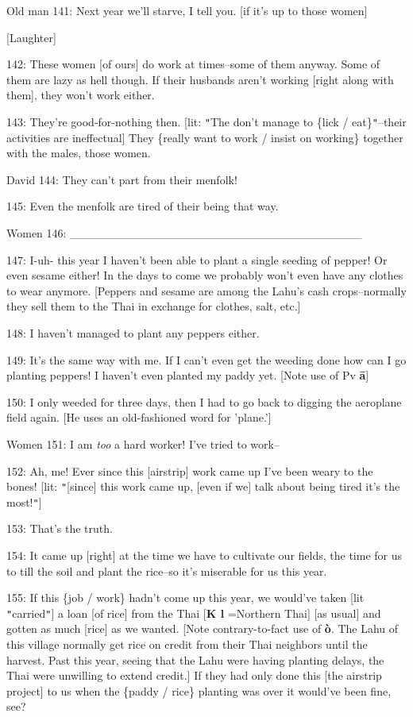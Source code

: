 Old man 141: Next year we'll starve, I tell you. [if it's up to those women]

\begin{center}
[Laughter]
\end{center}

\leftskip=0pt
142: These women [of ours] do work at times--some of them anyway. Some of them
are lazy as hell though. If their husbands aren't working [right along with them],
they won't work either.

143: They're good-for-nothing then. [lit: \texttt{"}The don't manage to \{lick
/ eat\}\texttt{"}--their activities are ineffectual] They \{really want to work
/ insist on working\} together with the males, those women.

David 144: They can't part from their menfolk!

145: Even the menfolk are tired of their being that way.

Women 146: \_\_\_\_\_\_\_\_\_\_\_\_\_\_\_\_\_\_\_\_\_\_\_\_\_\_\_\_\_\_\_\_\_\_\_

147: I-uh- this year I haven't been able to plant a single seeding of pepper! Or
even sesame either! In the days to come we probably won't even have any clothes
to wear anymore. [Peppers and sesame are among the Lahu's cash crops--normally
they sell them to the Thai in exchange for clothes, salt, etc.]

148: I haven't managed to plant any peppers either.

149: It's the same way with me. If I can't even get the weeding done how can I
go planting peppers! I haven't even planted my paddy yet. [Note use of Pv \textbf{ā}]

150: I only weeded for three days, then I had to go back to digging the aeroplane
field again. [He uses an old-fashioned word for 'plane.']

Women 151: I am \textit{too} a hard worker! I've tried to work--

152: Ah, me! Ever since this [airstrip] work came up I've been weary to the bones!
[lit: \texttt{"}[since] this work came up, [even if we] talk about being tired
it's the most!\texttt{"}]

153: That's the truth.

154: It came up [right] at the time we have to cultivate our fields, the time for
us to till the soil and plant the rice--so it's miserable for us this year.

155: If this \{job / work\} hadn't come up this year, we would've taken [lit \texttt{"}carried\texttt{"}]
a loan [of rice] from the Thai [\textbf{K l }=Northern Thai] [as usual] and gotten
as much [rice] as we wanted. [Note contrary-to-fact use of \textbf{ò}. The Lahu
of this village normally get rice on credit from their Thai neighbors until the
harvest. Past this year, seeing that the Lahu were having planting delays, the
Thai were unwilling to extend credit.] If they had only done this [the airstrip
project] to us when the \{paddy / rice\} planting was over it would've been fine,
see?

